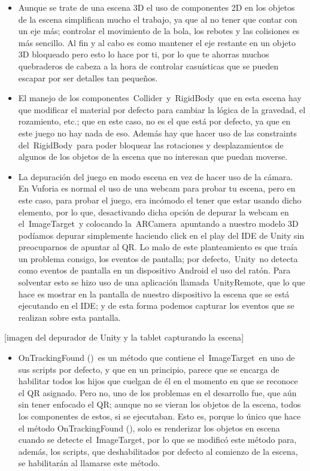 \begin{itemize}
\itemsep1pt\parskip0pt
\item
  Aunque se trate de una escena 3D el uso de componentes 2D en los
  objetos de la escena simplifican mucho el trabajo, ya que al no tener
  que contar con un eje más; controlar el movimiento de la bola, los
  rebotes y las colisiones es más sencillo. Al fin y al cabo es como
  mantener el eje restante en un objeto 3D bloqueado pero esto lo hace
  por ti, por lo que te ahorras muchos quebraderos de cabeza a la hora
  de controlar casuísticas que se pueden escapar por ser detalles tan
  pequeños.
\item
  El manejo de los componentes~Collider~y~RigidBody~que en esta escena
  hay que modificar el material por defecto para cambiar la lógica de la
  gravedad, el rozamiento, etc.; que en este caso, no es el que está por
  defecto, ya que en este juego no hay nada de eso. Además hay que hacer
  uso de las constraints del~RigidBody~para poder bloquear las
  rotaciones y desplazamientos de algunos de los objetos de la escena
  que no interesan que puedan moverse.
\item
  La depuración del juego en modo escena en vez de hacer uso de la
  cámara. En Vuforia es normal el uso de una webcam para probar tu
  escena, pero en este caso, para probar el juego, era incómodo el tener
  que estar usando dicho elemento, por lo que, desactivando dicha opción
  de depurar la webcam en el~ImageTarget~y colocando
  la~ARCamera~apuntando a nuestro modelo 3D podíamos depurar simplemente
  haciendo click en el play del IDE de Unity sin preocuparnos de apuntar
  al QR. Lo malo de este planteamiento es que traía un problema consigo,
  los eventos de pantalla; por defecto,~Unity~no detecta como eventos de
  pantalla en un dispositivo Android el uso del ratón. Para solventar
  esto se hizo uso de una aplicación llamada~UnityRemote, que lo que
  hace es mostrar en la pantalla de nuestro dispositivo la escena que se
  está ejecutando en el IDE; y de esta forma podemos capturar los
  eventos que se realizan sobre esta pantalla.
\end{itemize}

{[}imagen del depurador de Unity y la tablet capturando la escena{]}

\begin{itemize}
\itemsep1pt\parskip0pt
\item
  OnTrackingFound ()~es un método que contiene el~ImageTarget~en uno de
  sus scripts por defecto, y que en un principio, parece que se encarga
  de habilitar todos los hijos que cuelgan de él en el momento en que se
  reconoce el QR asignado. Pero no, uno de los problemas en el
  desarrollo fue, que aún sin tener enfocado el QR; aunque no se vieran
  los objetos de la escena, todos los componentes de estos, si se
  ejecutaban. Esto es, porque lo único que hace el método
  OnTrackingFound (), solo es renderizar los objetos en escena cuando se
  detecte el~ImageTarget, por lo que se modificó este método para,
  además, los scripts, que deshabilitados por defecto al comienzo de la
  escena, se habilitarán al llamarse este método.
\end{itemize}


